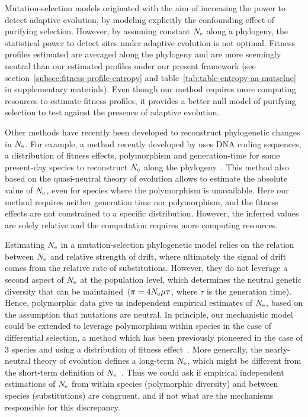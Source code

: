 Mutation-selection models originated with the aim of increasing the power to detect adaptive evolution, by modeling explicitly the confounding effect of purifying selection.
However, by assuming constant $N_{\mathrm{e}}$ along a phylogeny, the statistical power to detect sites under adaptive evolution is not optimal.
Fitness profiles estimated are averaged along the phylogeny and are more seemingly \gls{neutral} than our estimated profiles under our present framework (see section~\ref{subsec:fitness-profile-entropy} and table~\ref{tab:table-entropy-aa-mutselne} in supplementary materials).
Even though our method requires more computing resources to estimate fitness profiles, it provides a better null model of purifying selection to test against the presence of adaptive evolution.

Other methods have recently been developed to reconstruct phylogenetic changes in $N_{\mathrm{e}}$.
For example, a method recently developed by \citet{Brevet2019} uses \acrshort{DNA} coding sequences, a distribution of fitness effects, polymorphism and generation-time for some present-day species to reconstruct $N_{\mathrm{e}}$ along the phylogeny~\citep{Brevet2019}.
This method also based on the quasi-neutral theory of evolution allows to estimate the absolute value of $N_{\mathrm{e}}$, even for species where the polymorphism is unavailable.
Here our method requires neither generation time nor polymorphism, and the fitness effects are not constrained to a specific distribution.
However, the inferred values are solely relative and the computation requires more computing resources.

Estimating $N_{\mathrm{e}}$ in a mutation-selection phylogenetic model relies on the relation between $N_{\mathrm{e}}$ and relative strength of drift, where ultimately the signal of drift comes from the relative rate of \glspl{substitution}.
However, they do not leverage a second aspect of $N_{\mathrm{e}}$ at the population level, which determines the \gls{neutral} genetic diversity that can be maintained~($\pi=4N_{\mathrm{e}} \mu \tau$, where $\tau$ is the generation time).
Hence, \gls{polymorphic} data give us independent empirical estimates of $N_{\mathrm{e}}$, based on the assumption that mutations are \gls{neutral}.
In principle, our mechanistic model could be extended to leverage polymorphism within species in the case of differential selection, a method which has been previously pioneered in the case of $3$ species and using a distribution of fitness effect~\citep{Wilson2011}.
More generally, the \gls{nearly-neutral} theory of evolution defines a long-term $N_{\mathrm{e}}$, which might be different from the short-term definition of $N_{\mathrm{e}}$~\citep{Platt2018}.
Thus we could ask if empirical independent estimations of $N_{\mathrm{e}}$ from within species (polymorphic diversity) and between species (\glspl{substitution}) are congruent, and if not what are the mechanisms responsible for this discrepancy.

